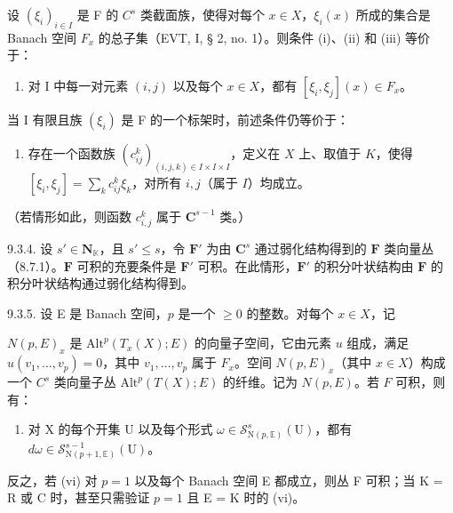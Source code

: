 设 \((\xi_{i})_{i\in I}\) 是 F 的 \(C^{s}\) 类截面族，使得对每个 \(x\in X\)，\(\xi_{i}(x)\) 所成的集合是 Banach 空间 \(F_{x}\) 的总子集（EVT, I, § 2, no. 1）。则条件 (i)、(ii) 和 (iii) 等价于：

\begin{enumerate}
\def\labelenumi{(\roman{enumi})}
\setcounter{enumi}{3}
\tightlist
\item
  对 I 中每一对元素 \((i,j)\) 以及每个 \(x\in X\)，都有 \([\xi_i,\xi_j](x)\in F_x\)。
\end{enumerate}

当 I 有限且族 \((\xi_{i})\) 是 F 的一个标架时，前述条件仍等价于：

\begin{enumerate}
\def\labelenumi{(\alph{enumi})}
\setcounter{enumi}{21}
\tightlist
\item
  存在一个函数族 \((c_{ij}^{k})_{(i,j,k)\in I\times I\times I}\)，定义在 \(X\) 上、取值于 \(K\)，使得 \([\xi_i,\xi_j] = \sum_{k}c_{ij}^k\xi_k\)，对所有 \(i,j\)（属于 \(I\)）均成立。
\end{enumerate}

（若情形如此，则函数 \(c_{i,j}^{k}\) 属于 \(\mathbf{C}^{s-1}\) 类。）

9.3.4. 设 \(s' \in \mathbf{N}_{\mathbb{K}}\)，且 \(s' \leqslant s\)，令 \(\mathbf{F}'\) 为由 \(\mathbf{C}^{s}\) 通过弱化结构得到的 \(\mathbf{F}\) 类向量丛（8.7.1）。\(\mathbf{F}\) 可积的充要条件是 \(\mathbf{F}'\) 可积。在此情形，\(\mathbf{F}'\) 的积分叶状结构由 \(\mathbf{F}\) 的积分叶状结构通过弱化结构得到。

9.3.5. 设 E 是 Banach 空间，\(p\) 是一个 \(\geqslant 0\) 的整数。对每个 \(x \in X\)，记

\(N(p, E)_{x}\) 是 \(\text{Alt}^{p}(T_{x}(X); E)\) 的向量子空间，它由元素 \(u\) 组成，满足 \(u(v_{1}, \ldots, v_{p}) = 0\)，其中 \(v_{1}, \ldots, v_{p}\) 属于 \(F_{x}\)。空间 \(N(p, E)_{x}\)（其中 \(x \in X\)）构成一个 \(C^{s}\) 类向量子丛 \(\text{Alt}^{p}(T(X); E)\) 的纤维。记为 \(N(p, E)\)。若 \(F\) 可积，则有：

\begin{enumerate}
\def\labelenumi{(\roman{enumi})}
\setcounter{enumi}{5}
\tightlist
\item
  对 X 的每个开集 U 以及每个形式 \(\omega \in \mathcal{S}_{\mathrm{N}(p,\mathbb{E})}^s (\mathrm{U})\)，都有 \(d\omega \in \mathcal{S}_{\mathrm{N}(p + 1,\mathbb{E})}^{s - 1}(\mathrm{U})\)。
\end{enumerate}

反之，若 (vi) 对 \(p=1\) 以及每个 Banach 空间 E 都成立，则丛 F 可积；当 K = R 或 C 时，甚至只需验证 \(p=1\) 且 E = K 时的 (vi)。

